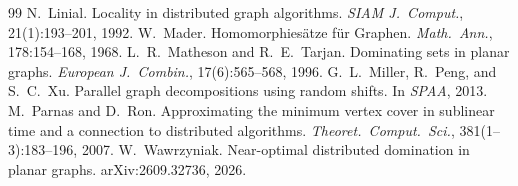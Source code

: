 \documentclass[11pt]{article}
\theoremstyle{remark}
\begin{document}
\begin{thebibliography}{99}
 N.~Linial. Locality in distributed graph algorithms. \emph{SIAM J.\ Comput.},
  21(1):193--201, 1992.
 W.~Mader. Homomorphies\"atze f\"ur Graphen. \emph{Math.\ Ann.}, 178:154--168, 1968.
 L.~R.~Matheson and R.~E.~Tarjan. Dominating sets in planar graphs. \emph{European
  J.\ Combin.}, 17(6):565--568, 1996.
 G.~L.~Miller, R.~Peng, and S.~C.~Xu. Parallel graph decompositions using random shifts. In
  \emph{SPAA}, 2013.
 M.~Parnas and D.~Ron. Approximating the minimum vertex cover in sublinear time and a
  connection to distributed algorithms. \emph{Theoret.\ Comput.\ Sci.}, 381(1--3):183--196, 2007.
 W.~Wawrzyniak. Near-optimal distributed domination in planar graphs.
  arXiv:2609.32736, 2026.
\end{thebibliography}
\end{document}
